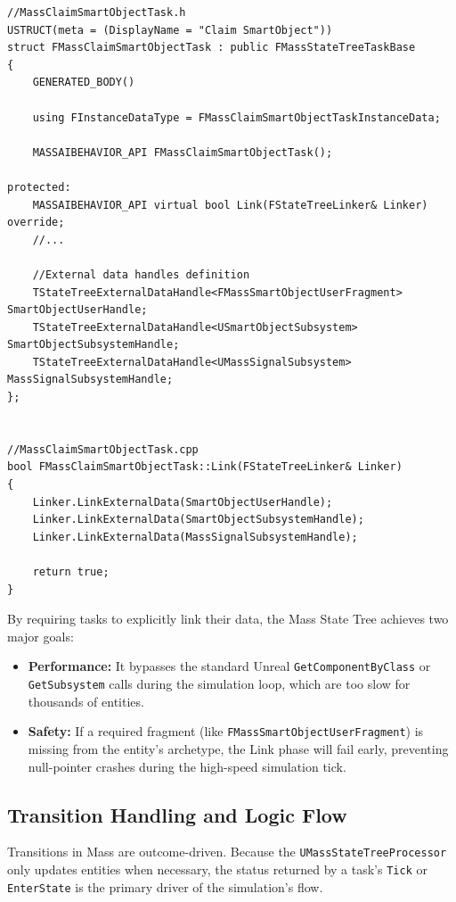 \begin{lstlisting}
//MassClaimSmartObjectTask.h
USTRUCT(meta = (DisplayName = "Claim SmartObject"))
struct FMassClaimSmartObjectTask : public FMassStateTreeTaskBase
{
	GENERATED_BODY()

	using FInstanceDataType = FMassClaimSmartObjectTaskInstanceData;

	MASSAIBEHAVIOR_API FMassClaimSmartObjectTask();

protected:
    MASSAIBEHAVIOR_API virtual bool Link(FStateTreeLinker& Linker) override;
    //...

    //External data handles definition
	TStateTreeExternalDataHandle<FMassSmartObjectUserFragment> SmartObjectUserHandle;
	TStateTreeExternalDataHandle<USmartObjectSubsystem> SmartObjectSubsystemHandle;
	TStateTreeExternalDataHandle<UMassSignalSubsystem> MassSignalSubsystemHandle;
};


//MassClaimSmartObjectTask.cpp
bool FMassClaimSmartObjectTask::Link(FStateTreeLinker& Linker)
{
	Linker.LinkExternalData(SmartObjectUserHandle);
	Linker.LinkExternalData(SmartObjectSubsystemHandle);
	Linker.LinkExternalData(MassSignalSubsystemHandle);

	return true;
}
\end{lstlisting}

By requiring tasks to explicitly link their data, the Mass State Tree achieves two major goals:

\begin{itemize}
    \item \textbf{Performance:} It bypasses the standard Unreal \texttt{GetComponentByClass} or \texttt{GetSubsystem} calls during the simulation loop, which are too slow for thousands of entities.
    \item \textbf{Safety:} If a required fragment (like \texttt{FMassSmartObjectUserFragment}) is missing from the entity’s archetype, the Link phase will fail early, preventing null-pointer crashes during the high-speed simulation tick.
\end{itemize}

\subsection{Transition Handling and Logic Flow}

Transitions in Mass are outcome-driven. Because the \texttt{UMassStateTreeProcessor} only updates entities when necessary, the status returned by a task's \texttt{Tick} or \texttt{EnterState} is the primary driver of the simulation's flow.

